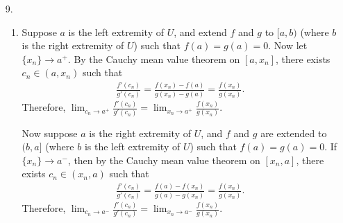 \documentclass[a4paper,12pt]{article}
\begin{document}
\begin{enumerate}
        \item[9.]
            \begin{enumerate}
                \item
                    Suppose $a$ is the left extremity of $U$, and extend $f$ and $g$ to $[a, b)$ (where $b$ is the right extremity of $U$) such that $f(a) = g(a) = 0$. Now let $\{ x_n \} \to a^+$. By the Cauchy mean value theorem on $[a, x_n]$, there exists $c_n \in (a, x_n)$ such that
                    \begin{align*}
                        \frac{f'(c_n)}{g'(c_n)} = \frac{f(x_n) - f(a)}{g(x_n) - g(a)} = \frac{f(x_n)}{g(x_n)}.
                    \end{align*}
                    Therefore, $\lim_{c_n \to a^+} \frac{f'(c_n)}{g'(c_n)} = \lim_{x_n \to a^+} \frac{f(x_n)}{g(x_n)}$. \par
                    Now suppose $a$ is the right extremity of $U$, and $f$ and $g$ are extended to $(b, a]$ (where $b$ is the left extremity of $U$) such that $f(a) = g(a) = 0$. If $\{ x_n \} \to a^-$, then by the Cauchy mean value theorem on $[x_n, a]$, there exists $c_n \in (x_n, a)$ such that
                    \begin{align*}
                        \frac{f'(c_n)}{g'(c_n)} = \frac{f(a) - f(x_n)}{g(a) - g(x_n)} = \frac{f(x_n)}{g(x_n)}.
                    \end{align*}
                    Therefore, $\lim_{c_n \to a^-} \frac{f'(c_n)}{g'(c_n)} = \lim_{x_n \to a^-} \frac{f(x_n)}{g(x_n)}$. \par


\end{enumerate}
\end{enumerate}
\end{document}
